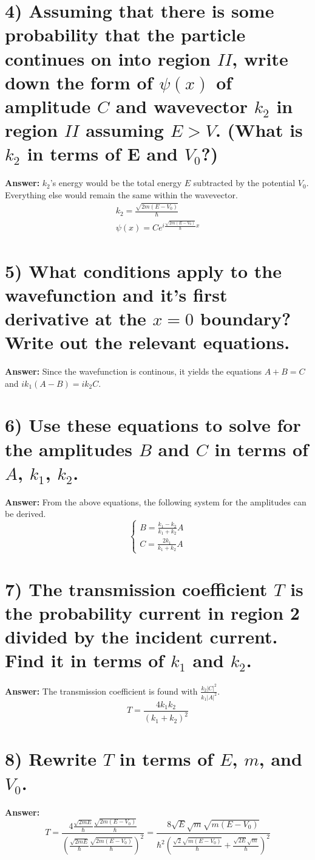 \documentclass[10pt,letterpaper]{article}
\begin{document}
\section*{4) Assuming that there is some probability that the particle continues on into region $II$, write down the form of $\psi(x)$ of amplitude $C$ and wavevector $k_{2}$ in region $II$ assuming $E > V$. (What is $k_{2}$ in terms of E and $V_{0}$?)}
\textbf{Answer:} $k_{2}$'s energy would be the total energy $E$ subtracted by the potential $V_{0}$. Everything else would remain the same within the wavevector.
\begin{gather*}
k_{2} = \frac{\sqrt{2m(E - V_{0})}}{\hbar} \\
\psi(x) = Ce^{i\frac{\sqrt{2m(E - V_{0})}}{\hbar}x}
\end{gather*}

\section*{5) What conditions apply to the wavefunction and it's first derivative at the $x = 0$ boundary? Write out the relevant equations.}
\textbf{Answer:} Since the wavefunction is continous, it yields the equations $A + B = C$ and $ik_{1}(A - B) = ik_{2}C$. 

\section*{6) Use these equations to solve for the amplitudes $B$ and $C$ in terms of $A$, $k_{1}$, $k_{2}$.}
\textbf{Answer:} From the above equations, the following system for the amplitudes can be derived. 
$$\begin{cases}
B = \frac{k_{1} - k_{2}}{k_{1} + k_{2}}A \\
C = \frac{2k_{1}}{k_{1} + k_{2}}A
\end{cases}$$

\section*{7) The transmission coefficient $T$ is the probability current in region 2 divided by the incident current. Find it in terms of $k_{1}$ and $k_{2}$.}
\textbf{Answer:} The transmission coefficient is found with $\frac{k_{2}|C|^{2}}{k_{1}|A|^{2}}$.
$$T = \frac{4k_{1}k_{2}}{(k_{1} + k_{2})^{2}}$$

\section*{8) Rewrite $T$ in terms of $E$, $m$, and $V_{0}$.}
\textbf{Answer:}
$$T = \frac{4\frac{\sqrt{2mE}}{\hbar}\frac{\sqrt{2m(E - V_{0})}}{\hbar}}{\left( \frac{\sqrt{2mE}}{\hbar} \frac{\sqrt{2m(E - V_{0})}}{\hbar} \right)^{2}} = \frac{8\sqrt{E} \sqrt{m} \sqrt{m(E - V_{0})}}{\hbar^{2} \left( \frac{\sqrt{2} \sqrt{m(E - V_{0})}}{\hbar} + \frac{\sqrt{2E} \sqrt{m}}{\hbar} \right)^{2}}$$
\end{document}
